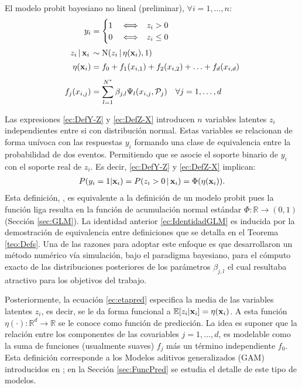 \documentclass[../Main/Main.tex]{subfiles}
\begin{document}
\pagebreak
\begin{definition} \label{def:BPWPMPrelim}
El modelo probit bayesiano no lineal (preliminar), $\forall i = 1,\ldots,n$: 
\begin{align}
y_i &= 
	\begin{cases}
		1 & \iff \enspace z_i > 0 \\									0 & \iff \enspace z_i \leq 0
	\end{cases} \label{ec:DefY-Z} \\[2pt]
z_i\,|\,\mathbf{x}_i\, &\sim \text{N}(z_i\,|\,\eta(\mathbf{x}_i),1) \label{ec:DefZ-X} \\[2pt]
\eta(\mathbf{x}_i) &= f_0 + f_1(x_{i,1}) + f_2(x_{i,2}) + \ldots + f_d(x_{i,d}) \label{ec:etapred} \\[4pt]
f_j(x_{i,j}) &= \sum_{l = 1}^{N^*} \beta_{j,l} \Psi_l(x_{i,j}, \mathcal{P}_j) \quad \forall j = 1,\ldots,d \label{ec:fj}
\end{align}	
\end{definition}
Las expresiones \eqref{ec:DefY-Z} y \eqref{ec:DefZ-X} introducen $n$ variables latentes $z_i$ independientes entre si con distribución normal. Estas variables se relacionan de forma unívoca con las respuestas $y_i$ formando una clase de equivalencia entre la probabilidad de dos eventos.  Permitiendo que se asocie el soporte binario de $y_i$ con el soporte real de $z_i$. Es decir, \eqref{ec:DefY-Z} y \eqref{ec:DefZ-X} implican:
\begin{align}
	P(y_i = 1 |\mathbf{x}_i) = P(z_i > 0 \,|\, \mathbf{x}_i) = \Phi(\eta(\mathbf{x}_i)). 	\label{ec:IdentidadGLM}
\end{align}
Esta definición, \citet{albert1993bayesian}, es equivalente a la definición de un modelo probit pues la función liga resulta en la función de acumulación normal estándar $\Phi:\mathbb{R}\rightarrow (0,1)$ (Sección \ref{sec:GLM}). La identidad anterior \eqref{ec:IdentidadGLM} es inducida por la demostración de equivalencia entre definiciones que se detalla en el Teorema \ref{teo:Defs}. Una de las razones para adoptar este enfoque es que \citeauthor{albert1993bayesian} desarrollaron un método numérico vía simulación, bajo el paradigma bayesiano, para el cómputo exacto de las distribuciones posteriores de los parámetros $\beta_{j,l}$ el cual resultaba atractivo para los objetivos del trabajo.
 
Posteriormente, la ecuación \eqref{ec:etapred} especifica la media de las variables latentes $z_i$, es decir, se le da forma funcional a $\mathbb{E}[z_i|\mathbf{x}_i] = \eta(\mathbf{x}_i)$. A esta función $\eta(\cdot):\mathbb{R}^d\rightarrow\mathbb{R}$ se le conoce como función de predicción. La idea es suponer que la relación entre los componentes de las covariables $j = 1,\ldots,d$, es modelable como la suma de funciones (usualmente suaves) $f_j$ más un término independiente $f_0$. Esta definición corresponde a los Modelos  aditivos generalizados (GAM) introducidos en \citet{hastie1986generalized}; en la Sección \ref{sec:FuncPred} se estudia el detalle de este tipo de modelos.
\end{document}
